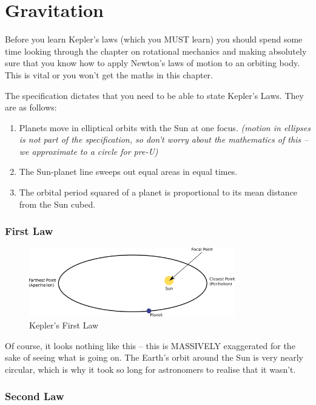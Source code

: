 \documentclass[main.tex]{subfiles}
\begin{document}
\chapter{Gravitation}
Before you learn Kepler's laws (which you MUST learn) you should spend
some time looking through the chapter on rotational mechanics and making
absolutely sure that you know how to apply Newton's laws of motion to an
orbiting body. This is vital or you won't get the maths in this chapter.

The specification dictates that you need to be able to state Kepler's
Laws. They are as follows:
\begin{enumerate}
\item
  Planets move in elliptical orbits with the Sun at one focus.
  \emph{(motion in ellipses is not part of the specification, so don't
  worry about the mathematics of this -- we approximate to a circle for
  pre-U)}
\item
  The Sun-planet line sweeps out equal areas in equal times.
\item
  The orbital period squared of a planet is proportional to its mean
  distance from the Sun cubed.
\end{enumerate}
\newpage
\subsection{First Law}
\begin{figure}[h]
  \begin{center}
  \includegraphics[width=0.8\textwidth]{figs/chapt-13/kepler-1.png}
\end{center}
  \caption{Kepler's First Law}
  \label{kepler-1}
\end{figure}

Of course, it looks nothing like this -- this is MASSIVELY exaggerated
for the sake of seeing what is going on. The Earth's orbit around the
Sun is very nearly circular, which is why it took so long for
astronomers to realise that it wasn't.

\subsection{Second Law}
\end{document}
